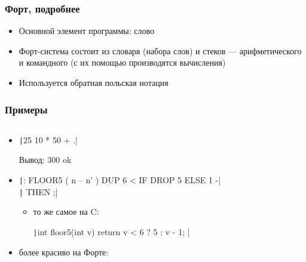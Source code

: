 \documentclass[xetex,mathserif,serif]{beamer}
\begin{document}
    \begin{frame}
        \frametitle{Форт, подробнее}
        \begin{itemize}
            \item Основной элемент программы: слово
            \item Форт-система состоит из словаря (набора слов) и стеков --- арифметического и командного (с их помощью производятся вычисления)
            \item Используется обратная польская нотация
        \end{itemize}
    \end{frame}

    \begin{frame}
        \frametitle{Примеры}
        \begin{columns}
            \begin{column}{0.82\textwidth}
                \begin{itemize}
                    \item \texttt|25 10 * 50 + .|

                        Вывод: 300 ok
                    \item \texttt|: FLOOR5 ( n -- n' )   DUP 6 < IF DROP 5 ELSE 1 -| \\
                        \texttt|  THEN ;|
                    \begin{itemize}
                        \item то же самое на C:

                        \texttt|int floor5(int v) { return v < 6 ? 5 : v - 1; }|
                    \end{itemize}
                    \item более красиво на Форте:


\end{itemize}
\end{column}
\end{columns}
\end{frame}
\end{document}
